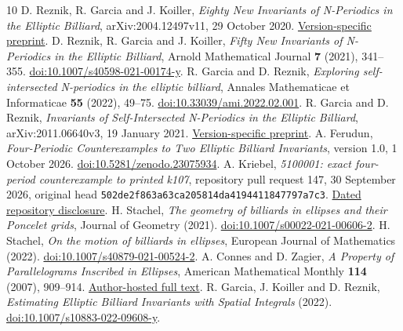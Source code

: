 \documentclass[11pt]{article}
\begin{document}
\begin{thebibliography}{10}
\small\setlength{\itemsep}{3pt}
 D. Reznik, R. Garcia and J. Koiller,
\emph{Eighty New Invariants of N-Periodics in the Elliptic Billiard},
arXiv:2004.12497v11, 29 October 2020.
\href{https://arxiv.org/abs/2004.12497v11}{Version-specific preprint}.
 D. Reznik, R. Garcia and J. Koiller,
\emph{Fifty New Invariants of N-Periodics in the Elliptic Billiard},
Arnold Mathematical Journal \textbf{7} (2021), 341--355.
\href{https://doi.org/10.1007/s40598-021-00174-y}{doi:10.1007/s40598-021-00174-y}.
 R. Garcia and D. Reznik,
\emph{Exploring self-intersected N-periodics in the elliptic billiard},
Annales Mathematicae et Informaticae \textbf{55} (2022), 49--75.
\href{https://doi.org/10.33039/ami.2022.02.001}{doi:10.33039/ami.2022.02.001}.
 R. Garcia and D. Reznik,
\emph{Invariants of Self-Intersected N-Periodics in the Elliptic Billiard},
arXiv:2011.06640v3, 19 January 2021.
\href{https://arxiv.org/abs/2011.06640v3}{Version-specific preprint}.
 A. Ferudun,
\emph{Four-Periodic Counterexamples to Two Elliptic Billiard Invariants},
version 1.0, 1 October 2026.
\href{https://doi.org/10.5281/zenodo.23075934}{doi:10.5281/zenodo.23075934}.
 A. Kriebel,
\emph{5100001: exact four-period counterexample to printed k107},
repository pull request 147, 30 September 2026, original head
\texttt{502de2f863a63ca205814da4194411847797a7c3}.
\href{https://github.com/AlecKriebel/Math/pull/147}{Dated repository disclosure}.
 H. Stachel,
\emph{The geometry of billiards in ellipses and their Poncelet grids},
Journal of Geometry (2021).
\href{https://doi.org/10.1007/s00022-021-00606-2}{doi:10.1007/s00022-021-00606-2}.
 H. Stachel,
\emph{On the motion of billiards in ellipses}, European Journal of Mathematics (2022).
\href{https://doi.org/10.1007/s40879-021-00524-2}{doi:10.1007/s40879-021-00524-2}.
 A. Connes and D. Zagier,
\emph{A Property of Parallelograms Inscribed in Ellipses},
American Mathematical Monthly \textbf{114} (2007), 909--914.
\href{https://people.mpim-bonn.mpg.de/zagier/files/amm/114/fulltext.pdf}{Author-hosted full text}.
 R. Garcia, J. Koiller and D. Reznik,
\emph{Estimating Elliptic Billiard Invariants with Spatial Integrals} (2022).
\href{https://doi.org/10.1007/s10883-022-09608-y}{doi:10.1007/s10883-022-09608-y}.
\end{thebibliography}
\end{document}
